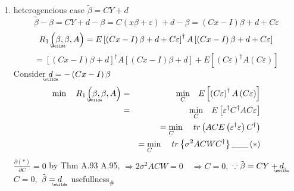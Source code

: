 \documentclass{article}
\begin{document}
\begin{enumerate}
\item heterogeneious case $\tilde{\beta}=CY+d$%
\begin{equation*}
\tilde{\beta}-\beta =CY+d-\beta =C\left( x\beta +\varepsilon \right)
+d-\beta =\left( Cx-I\right) \beta +d+C\varepsilon
\end{equation*}%
\begin{equation*}
R_{1}\left( 
\underaccent{\wtilde}{\beta}%
,\beta ,A\right) =E\left[ \left( Cx-I\right) \beta +d+C\varepsilon \right]
^{\dagger }A\left[ \left( Cx-I\right) \beta +d+C\varepsilon \right]
\end{equation*}%
\begin{equation*}
=\left[ \left( Cx-I\right) \beta +d\right] ^{\dagger }A\left[ \left(
Cx-I\right) \beta +d\right] +E\left[ \left( C\varepsilon \right) ^{\dagger
}A\left( C\varepsilon \right) \right]
\end{equation*}%
Consider $%
\underaccent{\wtilde}{d}%
=-\left( Cx-I\right) \beta $%
\begin{eqnarray}
\min \quad R_{1}\left( 
\underaccent{\wtilde}{\beta}%
,\beta ,A\right) &=&\underset{C}{\min }\quad E\left[ \left( C\varepsilon
\right) ^{\dagger }A\left( C\varepsilon \right) \right]  \notag \\
&=&\underset{C}{\min }\quad E\left[ \varepsilon ^{\dagger }C^{\dagger
}AC\varepsilon \right]  \notag \\
&&\underset{C}{=\min }\quad tr\left( ACE\left( \varepsilon ^{\dagger
}\varepsilon \right) C^{\dagger }\right)  \notag \\
&&\underset{C}{=\min }\quad tr\left\{ \sigma ^{2}ACWC^{\dagger }\right\} 
\underline{\qquad }\left( \ast \right)
\end{eqnarray}%
$\frac{\partial \left( \ast \right) }{\partial C}=0$ by Thm A.93%
A.95, $\Rightarrow 2\sigma ^{2}ACW=0\quad \Rightarrow C=0,$ $\because \tilde{%
\beta}=CY+%
\underaccent{\wtilde}{d}%
,$ $C=0,$ $\tilde{\beta}=%
\underaccent{\wtilde}{d}%
\quad $usefullness$_{\#}$


\end{enumerate}
\end{document}
